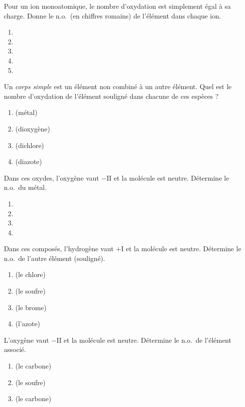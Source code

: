 \documentclass[11pt,a4paper]{article}
\begin{document}
\begin{exo}
Pour un ion monoatomique, le nombre d'oxydation est simplement égal à sa charge. Donne le n.o.\ (en
chiffres romains) de l'élément dans chaque ion.
\begin{enumerate}[label=\alph*)]
  \item {}
  \item {}
  \item {}
  \item {}
  \item {}
\end{enumerate}
\end{exo}

\begin{exo}
Un \emph{corps simple} est un élément non combiné à un autre élément. Quel est le nombre d'oxydation de
l'élément souligné dans chacune de ces espèces ?
\begin{enumerate}[label=\alph*)]
  \item {} (métal)
  \item {} (dioxygène)
  \item {} (dichlore)
  \item {} (diazote)
\end{enumerate}
\end{exo}

\begin{exo}[appliquer « oxygène $=-\mathrm{II}$ » dans un oxyde neutre]
Dans ces oxydes, l'oxygène vaut $-\mathrm{II}$ et la molécule est neutre. Détermine le n.o.\ du métal.
\begin{enumerate}[label=\alph*)]
  \item {}
  \item {}
  \item {}
  \item {}
\end{enumerate}
\end{exo}

\begin{exo}[appliquer « hydrogène $=+\mathrm{I}$ »]
Dans ces composés, l'hydrogène vaut $+\mathrm{I}$ et la molécule est neutre. Détermine le n.o.\ de l'autre
élément (souligné).
\begin{enumerate}[label=\alph*)]
  \item {} (le chlore)
  \item {} (le soufre)
  \item {} (le brome)
  \item {} (l'azote)
\end{enumerate}
\end{exo}

\begin{exo}
L'oxygène vaut $-\mathrm{II}$ et la molécule est neutre. Détermine le n.o.\ de l'élément associé.
\begin{enumerate}[label=\alph*)]
  \item {} (le carbone)
  \item {} (le soufre)
  \item {} (le carbone)
\end{enumerate}
\end{exo}
\end{document}
